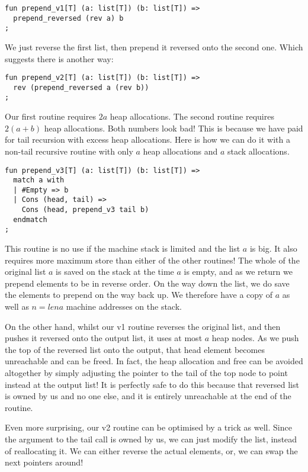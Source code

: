 \documentclass[oneside]{book}
\begin{document}
\begin{verbatim}
fun prepend_v1[T] (a: list[T]) (b: list[T]) =>
  prepend_reversed (rev a) b
;
\end{verbatim}

We just reverse the first list, then prepend it reversed
onto the second one. Which suggests there is another way:

\begin{verbatim}
fun prepend_v2[T] (a: list[T]) (b: list[T]) =>
  rev (prepend_reversed a (rev b))
;
\end{verbatim}

Our first routine requires $2a$ heap allocations.
The second routine requires $2(a+b)$ heap allocations.
Both numbers look bad! This is because we have paid
for tail recursion with excess heap allocations.
Here is how we can do it with a non-tail recursive
routine with only $a$ heap allocations and $a$
stack allocations.

\begin{verbatim}
fun prepend_v3[T] (a: list[T]) (b: list[T]) =>
  match a with
  | #Empty => b
  | Cons (head, tail) => 
    Cons (head, prepend_v3 tail b)
  endmatch
;
\end{verbatim}

This routine is no use if the machine stack is limited and the
list $a$ is big. It also requires more maximum store than
either of the other routines! The whole of the original list $a$ is saved
on the stack at the time $a$ is empty, and as we return we prepend elements
to be in reverse order. On the way down the list, we do save the elements
to prepend on the way back up. We therefore have a copy of $a$ as well
as $n=len a$ machine addresses on the stack.

On the other hand, whilst our v1 routine reverses the original list,
and then pushes it reversed onto the output list, it uses at most
$a$ heap nodes. As we push the top of the reversed list onto
the output, that head element becomes unreachable and can be freed.
In fact, the heap allocation and free can be avoided altogether
by simply adjusting the pointer to the tail of the top node to
point instead at the output list! It is perfectly safe to do this
because that reversed list is owned by us and no one else, and
it is entirely unreachable at the end of the routine.

Even more surprising, our v2 routine can be optimised by a
trick as well. Since the argument to the tail call is owned
by us, we can just modify the list, instead of reallocating it.
We can either reverse the actual elements, or, we can swap
the next pointers around!
\end{document}

